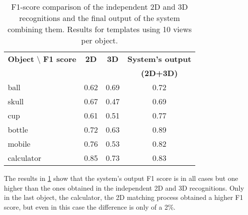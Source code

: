 \begin{table}[H]
\centering
\begin{tabular} {l c c c }
\toprule
\addlinespace[3mm]


\textbf{Object} \backslash \textbf{ F1 score} & \textbf{2D} & \textbf{3D} & \textbf{System's output}\\&&& \textbf{(2D+3D)} \\

\midrule
ball		&	0.62 	&		0.69		&	0.72\\
skull		&	0.67	&		0.47		&	0.69\\
cup			&	0.61	&		0.51		&	0.77\\
bottle		&	0.72	&		0.63		&	0.89\\
mobile		&	0.76	&		0.53		&	0.82\\
calculator	&	0.85	&		0.73		&	0.83\\

\bottomrule
\end{tabular}
\caption[F1-score comparison 2D, 3D and 2D+3D results]{F1-score comparison of the independent 2D and 3D recognitions and the final output of the system combining them. Results for templates using 10 views per object. }
\label{comparison_fscore_23d}
\end{table}


The results in \ref{comparison_fscore_23d} show that the system's output F1 score is in all cases but one higher than the ones obtained in the independent 2D and 3D recognitions. 
Only in the last object, the calculator, the 2D matching process obtained a higher F1 score, but even in this case the difference is only of a 2\%. 